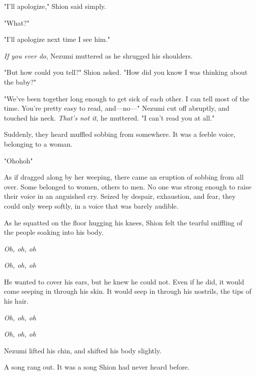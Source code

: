 "I'll apologize," Shion said simply.

"What?"

"I'll apologize next time I see him."

\emph{If you ever do}, Nezumi muttered as he shrugged his shoulders.

"But how could you tell?" Shion asked. "How did you know I was thinking
about the baby?"

"We've been together long enough to get sick of each other. I can tell
most of the time. You're pretty easy to read, and---no---" Nezumi cut off
abruptly, and touched his neck. \emph{That's not it}, he muttered. "I can't
read you at all."

Suddenly, they heard muffled sobbing from somewhere. It was a feeble
voice, belonging to a woman.

"Oh\el oh\el oh\el "

As if dragged along by her weeping, there came an eruption of sobbing
from all over. Some belonged to women, others to men. No one was strong
enough to raise their voice in an anguished cry. Seized by despair,
exhaustion, and fear, they could only weep softly, in a voice that was
barely audible.

As he squatted on the floor hugging his knees, Shion felt the tearful
sniffling of the people soaking into his body.

\emph{Oh, oh, oh\el }

\emph{Oh, oh, oh\el }

He wanted to cover his ears, but he knew he could not. Even if he did,
it would come seeping in through his skin. It would seep in through his
nostrils, the tips of his hair.

\emph{Oh, oh, oh\el }

\emph{Oh, oh, oh\el }

Nezumi lifted his chin, and shifted his body slightly.

A song rang out. It was a song Shion had never heard before.


